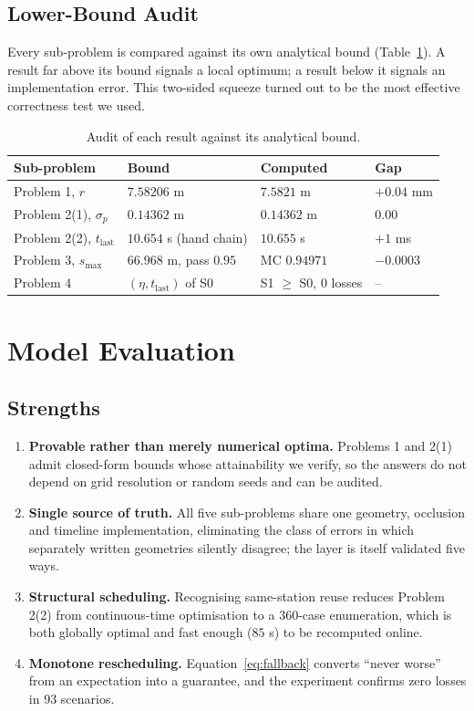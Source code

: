 \documentclass[12pt]{article}
\begin{document}
\subsection{Lower-Bound Audit}

Every sub-problem is compared against its own analytical bound (Table~\ref{tab:lower}). A result far above its bound signals a local optimum; a result below it signals an implementation error. This two-sided squeeze turned out to be the most effective correctness test we used.

\begin{table}[htbp]
  \centering
  \caption{Audit of each result against its analytical bound.}
  \label{tab:lower}
  \begin{tabular}{llll}
    \toprule
    Sub-problem & Bound & Computed & Gap \\
    \midrule
    Problem 1, $r$ & $7.58206$ m & $7.5821$ m & $+0.04$ mm \\
    Problem 2(1), $\sigma_p$ & $0.14362$ m & $0.14362$ m & $0.00$ \\
    Problem 2(2), $t_{\mathrm{last}}$ & $10.654$ s (hand chain) & $10.655$ s & $+1$ ms \\
    Problem 3, $s_{\max}$ & $66.968$ m, pass $0.95$ & MC $0.94971$ & $-0.0003$ \\
    Problem 4 & $(\eta,t_{\mathrm{last}})$ of S0 & S1 $\ge$ S0, 0 losses & -- \\
    \bottomrule
  \end{tabular}
\end{table}

\section{Model Evaluation}

\subsection{Strengths}

\begin{enumerate}[leftmargin=2em]
  \item \textbf{Provable rather than merely numerical optima.} Problems 1 and 2(1) admit closed-form bounds whose attainability we verify, so the answers do not depend on grid resolution or random seeds and can be audited.
  \item \textbf{Single source of truth.} All five sub-problems share one geometry, occlusion and timeline implementation, eliminating the class of errors in which separately written geometries silently disagree; the layer is itself validated five ways.
  \item \textbf{Structural scheduling.} Recognising same-station reuse reduces Problem 2(2) from continuous-time optimisation to a 360-case enumeration, which is both globally optimal and fast enough ($85$ s) to be recomputed online.
  \item \textbf{Monotone rescheduling.} Equation~\eqref{eq:fallback} converts ``never worse'' from an expectation into a guarantee, and the experiment confirms zero losses in 93 scenarios.
\end{enumerate}
\end{document}
